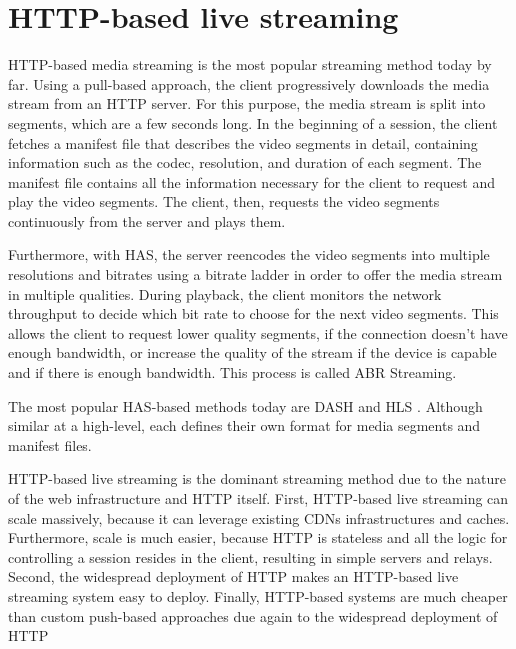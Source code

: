 \section{HTTP-based live streaming}
HTTP-based media streaming is the most popular streaming method today by far. Using a pull-based approach, the client progressively downloads the media stream from an HTTP server. For this purpose, the media stream is split into segments, which are a few seconds long. In the beginning of a session, the client fetches a manifest file that describes the video segments in detail, containing information such as the codec, resolution, and duration of each segment. The manifest file contains all the information necessary for the client to request and play the video segments. The client, then, requests the video segments continuously from the server and plays them.

Furthermore, with \acf{HAS}, the server reencodes the video segments into multiple resolutions and bitrates using a bitrate ladder in order to offer the media stream in multiple qualities. During playback, the client monitors the network throughput to decide which bit rate to choose for the next video segments. This allows the client to request lower quality segments, if the connection doesn't have enough bandwidth, or increase the quality of the stream if the device is capable and if there is enough bandwidth. This process is called \ac{ABR} Streaming.

The most popular HAS-based methods today are \ac{DASH} \parencite{14:00-17:00ISOIEC230091} and \ac{HLS} \parencite{incHTTPLiveStreaming}. Although similar at a high-level, each defines their own format for media segments and manifest files.

HTTP-based live streaming is the dominant streaming method due to the nature of the web infrastructure and HTTP itself. First, HTTP-based live streaming can scale massively, because it can leverage existing CDNs infrastructures and caches. Furthermore, scale is much easier, because HTTP is stateless and all the logic for controlling a session resides in the client, resulting in simple servers and relays. Second, the widespread deployment of HTTP makes an HTTP-based live streaming system easy to deploy. Finally, HTTP-based systems are much cheaper than custom push-based approaches due again to the widespread deployment of HTTP

